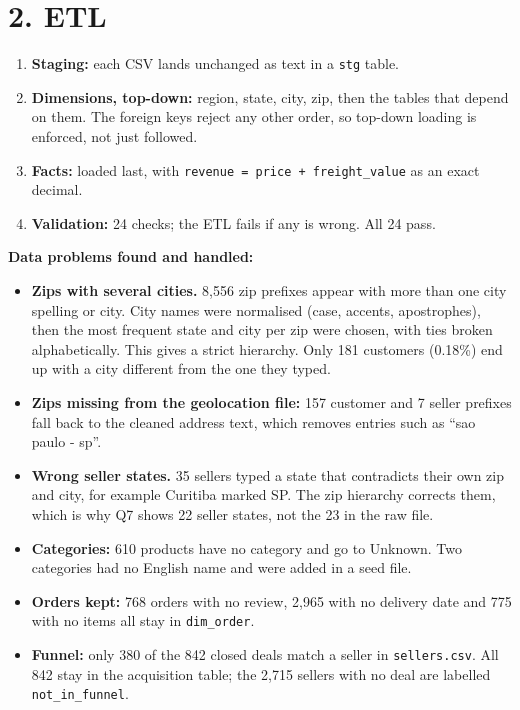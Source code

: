 \documentclass[10pt]{article}
\begin{document}
\section*{2. ETL}
\begin{enumerate}
\item \textbf{Staging:} each CSV lands unchanged as text in a \texttt{stg} table.
\item \textbf{Dimensions, top-down:} region, state, city, zip, then the tables that depend on them. The foreign keys reject any other order, so top-down loading is enforced, not just followed.
\item \textbf{Facts:} loaded last, with \texttt{revenue = price + freight\_value} as an exact decimal.
\item \textbf{Validation:} 24 checks; the ETL fails if any is wrong. All 24 pass.
\end{enumerate}
\textbf{Data problems found and handled:}
\begin{itemize}
\item \textbf{Zips with several cities.} 8,556 zip prefixes appear with more than one city spelling or city. City names were normalised (case, accents, apostrophes), then the most frequent state and city per zip were chosen, with ties broken alphabetically. This gives a strict hierarchy. Only 181 customers (0.18\%) end up with a city different from the one they typed.
\item \textbf{Zips missing from the geolocation file:} 157 customer and 7 seller prefixes fall back to the cleaned address text, which removes entries such as ``sao paulo - sp''.
\item \textbf{Wrong seller states.} 35 sellers typed a state that contradicts their own zip and city, for example Curitiba marked SP. The zip hierarchy corrects them, which is why Q7 shows 22 seller states, not the 23 in the raw file.
\item \textbf{Categories:} 610 products have no category and go to Unknown. Two categories had no English name and were added in a seed file.
\item \textbf{Orders kept:} 768 orders with no review, 2,965 with no delivery date and 775 with no items all stay in \texttt{dim\_order}.
\item \textbf{Funnel:} only 380 of the 842 closed deals match a seller in \texttt{sellers.csv}. All 842 stay in the acquisition table; the 2,715 sellers with no deal are labelled \texttt{not\_in\_funnel}.
\end{itemize}
\end{document}
